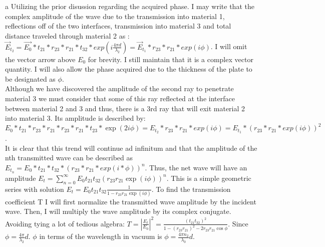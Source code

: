 \begin{homeworkProblem}
\begin{homeworkSection}{a}
Utilizing the prior disussion regarding the acquired phase. I may write that the complex amplitude of the wave due to the transmission into material 1, reflections off of the two interfaces, transmission into material 3 and total distance traveled through material 2 as : $\vec{E}_{t_2} = \vec{E_0}*t_{21}*r_{23}*r_{21}*t_{32}*exp(i\frac{4\pi d}{\lambda_2}) = \vec{E}_{t_1}*r_{23}*r_{21}*exp(i\phi)$. I will omit the vector arrow above $E_0$ for brevity. I still maintain that it is a complex vector quantity. I will also allow the phase acquired due to the thickness of the plate to be designated as $\phi$. 
\\

Although we have discovered the amplitude of the second ray to penetrate material 3 we must consider that some of this ray reflected at the interface between material 2 and 3 and thus, there is a 3rd ray that will exit material 2 into material 3. Its amplitude is described by: $E_0*t_{21}*r_{23}*r_{21}*r_{23}*r_{21}*t_{23}*\exp(2 i\phi) = E_{t_2}*r_{23}*r_{21}*exp(i\phi) = E_{t_1}* (r_{23}*r_{21}*exp(i\phi))^2$.
\\

It is clear that this trend will continue ad infinitum and that the amplitude of the nth transmitted wave can be described as $E_{t_n} = E_0*t_{21}*t_{32}*(r_{23}*r_{21}*exp(i*\phi))^n$. Thus, the net wave will have an amplitude $E_t = \sum\limits_{n=0}^\infty E_0 t_{21} t_{32} (r_{23}r_{21}\exp(i\phi))^n$. This is a simple geometric series with solution $E_t = E_0 t_{21} t_{32} \frac{1}{1-r_{23}r_{21}\exp(i\phi)}$. To find the transmission coefficient T I will first normalize the transmitted wave amplitude by the incident wave. Then, I will multiply the wave amplitude by its complex conjugate. Avoiding tying a lot of tedious algebra: $T = |\frac{E_t}{E_0}|^2 = \frac{(t_{21}t_{32})^2}{1-(r_{23}r_{21})^2-2 r_{23} r_{21} \cos\phi }$. Since $\phi = \frac{4\pi}{\lambda_2}d$. $\phi$ in terms of the wavelength in vacuum is $\phi = \frac{4\pi n_2}{\lambda_0}d$.

\end{homeworkSection}


\end{homeworkProblem}
